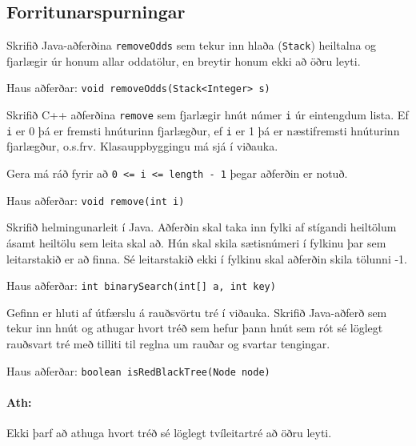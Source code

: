 \documentclass[addpoints]{exam}
\begin{document}
\begin{questions}

	\newpage

	\section{Forritunarspurningar}

	\question[10]

	Skrifið Java-aðferðina \texttt{removeOdds} sem tekur inn hlaða (\texttt{Stack}) heiltalna og fjarlægir úr honum allar oddatölur, en breytir honum ekki að öðru leyti.

	Haus aðferðar: \texttt{void removeOdds(Stack<Integer> s)}


	\newpage

	\question[10]

	Skrifið C++ aðferðina \texttt{remove} sem fjarlægir hnút númer \texttt{i} úr eintengdum lista. Ef \texttt{i} er 0 þá er fremsti hnúturinn fjarlægður, ef \texttt{i} er 1 þá er næstifremsti hnúturinn fjarlægður, o.s.frv. Klasauppbyggingu má sjá í viðauka. 
	
	Gera má ráð fyrir að \texttt{0 <= i <= length - 1} þegar aðferðin er notuð.

	Haus aðferðar: \texttt{void remove(int i)}


	\newpage

	\question[10]

	Skrifið helmingunarleit í Java. Aðferðin skal taka inn fylki af stígandi heiltölum ásamt heiltölu sem leita skal að. Hún skal skila sætisnúmeri í fylkinu þar sem leitarstakið er að finna. Sé leitarstakið ekki í fylkinu skal aðferðin skila tölunni -1.

	Haus aðferðar: \texttt{int binarySearch(int[] a, int key)}


	\newpage

	\question[10]

	Gefinn er hluti af útfærslu á rauðsvörtu tré í viðauka. Skrifið Java-aðferð sem tekur inn hnút og athugar hvort tréð sem hefur þann hnút sem rót sé löglegt rauðsvart tré með tilliti til reglna um rauðar og svartar tengingar.

	Haus aðferðar: \texttt{boolean isRedBlackTree(Node node)}


	\paragraph{Ath:} Ekki þarf að athuga hvort tréð sé löglegt tvíleitartré að öðru leyti.


\end{questions}
\end{document}
